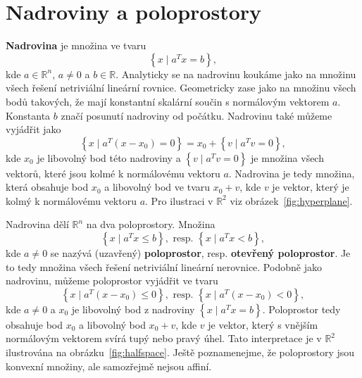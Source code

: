 \section{Nadroviny a poloprostory}

\textbf{Nadrovina} je množina ve tvaru
$$
    \left\{ x \mid a^T x = b \right\},
$$
kde $a \in \mathbb{R}^n$, $a \neq 0$ a $b \in \mathbb{R}$. Analyticky se na nadrovinu koukáme jako na množinu všech řešení netriviální lineární rovnice. Geometricky zase jako na množinu všech bodů takových, že mají konstantní skalární součin s normálovým vektorem $a$. Konstanta $b$ značí posunutí nadroviny od počátku. Nadrovinu také můžeme vyjádřit jako
$$
    \left\{ x \mid a^T (x - x_0) = 0 \right\} = x_0 + \left\{ v \mid a^T v = 0 \right\},
$$
kde $x_0$ je libovolný bod této nadroviny a $\left\{ v \mid a^T v = 0 \right\}$ je množina všech vektorů, které jsou kolmé k normálovému vektoru $a$. Nadrovina je tedy množina, která obsahuje bod $x_0$ a libovolný bod ve tvaru $x_0 + v$, kde $v$ je vektor, který je kolmý k normálovému vektoru $a$. Pro ilustraci v $\mathbb{R}^2$ viz obrázek~\ref{fig:hyperplane}.

Nadrovina dělí $\mathbb{R}^n$ na dva poloprostory. Množina 
$$
    \left\{ x \mid a^T x \leq b \right\}, \text{ resp. } \left\{ x \mid a^T x < b \right\},
$$
kde $a \neq 0$ se nazývá (uzavřený) \textbf{poloprostor}, resp. \textbf{otevřený poloprostor}. Je to tedy množina všech řešení netriviální lineární nerovnice. Podobně jako nadrovinu, můžeme poloprostor vyjádřit ve tvaru
$$
    \left\{ x \mid a^T (x - x_0) \leq 0 \right\}, \text{ resp. } \left\{ x \mid a^T (x - x_0) < 0 \right\},
$$
kde $a \neq 0$ a $x_0$ je libovolný bod z nadroviny $\left\{ x \mid a^T x = b \right\}$. Poloprostor tedy obsahuje bod $x_0$ a libovolný bod $x_0 + v$, kde $v$ je vektor, který s vnějším normálovým vektorem svírá tupý nebo pravý úhel. Tato interpretace je v $\mathbb{R}^2$ ilustrována na obrázku~\ref{fig:halfspace}. Ještě poznamenejme, že poloprostory jsou konvexní množiny, ale samozřejmě nejsou affiní.

